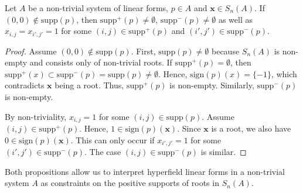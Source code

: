 \begin{proposition}
Let $A$ be a non-trivial system of linear forms, $p \in A$ and $\mathbf{x} \in S_{n}(A)$. 
If $(0,0) \notin \mathrm{supp}(p)$, then $\mathrm{supp}^+(p) \neq \emptyset$, $\mathrm{supp}^-(p) \neq \emptyset$ as well as $x_{i,j} = x_{i',j'} = 1$ for some $(i,j) \in \mathrm{supp}^+(p)$ and $(i',j') \in \mathrm{supp}^-(p)$.
\end{proposition}

\begin{proof}
Assume $(0,0) \notin \mathrm{supp}(p)$. First, $\mathrm{supp}(p) \neq \emptyset$ because $S_{n}(A)$ is non-empty and consists only of non-trivial roots. If $\mathrm{supp}^+(p) = \emptyset$, then $\mathrm{supp}^+(x) \subset \mathrm{supp}^-(p) = \mathrm{supp}(p) \neq \emptyset$. Hence, $\mathrm{sign}(p)(x) = \{ -1 \}$, which contradicts $\mathbf{x}$ being a root. Thus, $\mathrm{supp}^+(p)$ is non-empty. Similarly, $\mathrm{supp}^-(p)$ is non-empty.

By non-triviality, $x_{i,j} = 1$ for some $(i,j) \in \mathrm{supp}(p)$. Assume $(i,j) \in \mathrm{supp}^+(p)$. Hence, $1 \in \mathrm{sign}(p)(\mathbf{x})$.  Since $\mathbf{x}$ is a root, we also have $0 \in \mathrm{sign}(p)(\mathbf{x})$. This can only occur if $x_{i',j'} = 1$ for some $(i',j') \in \mathrm{supp}^-(p)$. The case $(i,j) \in \mathrm{supp}^-(p)$ is similar. 
\end{proof}

Both propositions allow us to interpret hyperfield linear forms in a non-trivial system $A$ as constraints on the positive supports of roots in $S_{n}(A)$.


